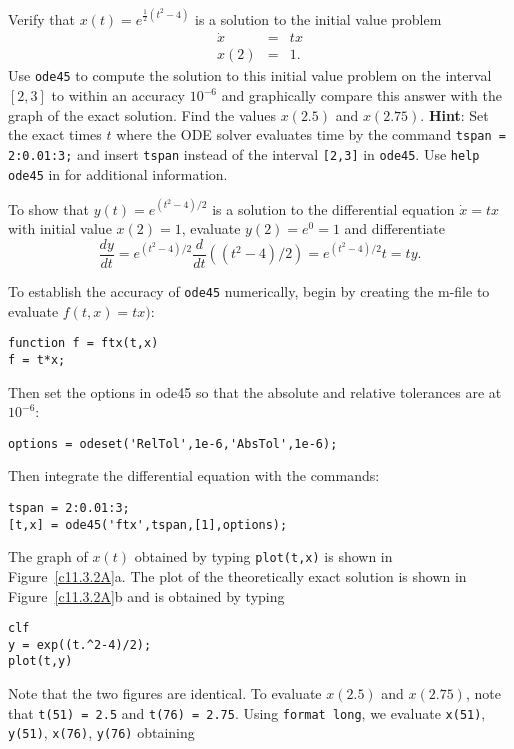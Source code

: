 \documentclass{ximera}
\begin{document}
\begin{exercise} \label{c11.3.2A}
Verify that $x(t) = e^{\frac{1}{2}(t^2-4)}$ is a solution to the initial 
value problem
\[
\begin{array}{rcl}
\dot{x} & = & tx \\
x(2) & = & 1.
\end{array}
\]
Use {\tt ode45} to compute the solution to this initial value problem on the
interval $[2,3]$ to within an accuracy $10^{-6}$ and graphically compare this 
answer with the graph of the exact solution.  Find the values $x(2.5)$ and
$x(2.75)$.  {\bf Hint}: Set the exact times $t$ where the ODE solver 
evaluates time by the command {\tt tspan = 2:0.01:3;} and insert {\tt tspan}
instead of the interval {\tt [2,3]} in {\tt ode45}.  Use {\tt help ode45} in 
\Matlab for additional information. 

\begin{solution}

To show that $y(t)=e^{(t^2-4)/2}$ is a solution to the differential equation
$\dot{x}=tx$ with initial value $x(2)=1$, evaluate $y(2)=e^0=1$ and
differentiate
\[
\frac{dy}{dt} = e^{(t^2-4)/2}\frac{d}{dt}((t^2-4)/2) = 
e^{(t^2-4)/2}t = ty.
\]

To establish the accuracy of {\tt ode45} numerically, begin by creating the 
m-file to evaluate $f(t,x)=tx)$:
\begin{verbatim}
function f = ftx(t,x)
f = t*x;
\end{verbatim}
Then set the options in {\sf ode45} so that the absolute and relative
tolerances are at $10^{-6}$:
\begin{verbatim}
options = odeset('RelTol',1e-6,'AbsTol',1e-6);
\end{verbatim}
Then integrate the differential equation with the commands:
\begin{verbatim}
tspan = 2:0.01:3;
[t,x] = ode45('ftx',tspan,[1],options);
\end{verbatim}
The graph of $x(t)$ obtained by typing {\tt plot(t,x)} is shown in
Figure~\ref{c11.3.2A}a.  The plot of the theoretically exact solution
is shown in Figure~\ref{c11.3.2A}b and is obtained by typing
\begin{verbatim}
clf
y = exp((t.^2-4)/2);
plot(t,y)
\end{verbatim}
Note that the two figures are identical.  To evaluate $x(2.5)$ and $x(2.75)$,
note that {\tt t(51) = 2.5} and {\tt t(76) = 2.75}.  Using {\tt format long}, 
we evaluate {\tt x(51)}, {\tt y(51)}, {\tt x(76)}, {\tt y(76)} obtaining


\end{solution}
\end{exercise}
\end{document}

